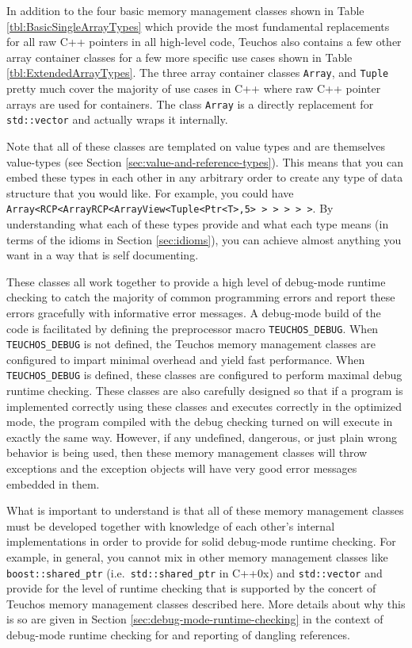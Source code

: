 \documentclass[pdf,ps2pdf,11pt]{SANDreport}
\begin{document}
In addition to the four basic memory management classes shown in Table
{}\ref{tbl:BasicSingleArrayTypes} which provide the most fundamental
replacements for all raw C++ pointers in all high-level code, Teuchos
also contains a few other array container classes for a few more
specific use cases shown in Table {}\ref{tbl:ExtendedArrayTypes}.
The three array container classes {}\texttt{Array}, and
{}\texttt{Tuple} pretty much cover the majority of use cases in C++
where raw C++ pointer arrays are used for containers.  The class
{}\texttt{Array} is a directly replacement for {}\texttt{std::vector}
and actually wraps it internally.

Note that all of these classes are templated on value types and are
themselves value-types (see Section
{}\ref{sec:value-and-reference-types}).  This means that you can
embed these types in each other in any arbitrary order to create any
type of data structure that you would like.  For example, you could
have {}\texttt{Array<RCP<ArrayRCP<ArrayView<Tuple<Ptr<T>,5> > > > >
>}.  By understanding what each of these types provide and what each
type means (in terms of the idioms in Section {}\ref{sec:idioms}), you
can achieve almost anything you want in a way that is self
documenting.

These classes all work together to provide a high level of debug-mode
runtime checking to catch the majority of common programming errors
and report these errors gracefully with informative error messages.  A
debug-mode build of the code is facilitated by defining the
preprocessor macro {}\texttt{TEUCHOS\_DEBUG}.  When
{}\texttt{TEUCHOS\_DEBUG} is not defined, the Teuchos memory
management classes are configured to impart minimal overhead and yield
fast performance.  When {}\texttt{TEUCHOS\_DEBUG} is defined, these
classes are configured to perform maximal debug runtime checking.
These classes are also carefully designed so that if a program is
implemented correctly using these classes and executes correctly in
the optimized mode, the program compiled with the debug checking
turned on will execute in exactly the same way.  However, if any
undefined, dangerous, or just plain wrong behavior is being used, then
these memory management classes will throw exceptions and the
exception objects will have very good error messages embedded in them.

What is important to understand is that all of these memory management
classes must be developed together with knowledge of each other's
internal implementations in order to provide for solid debug-mode
runtime checking.  For example, in general, you cannot mix in other
memory management classes like {}\texttt{boost::shared\_ptr} (i.e.\
{}\texttt{std::shared\_ptr} in C++0x) and {}\texttt{std::vector} and
provide for the level of runtime checking that is supported by the
concert of Teuchos memory management classes described here.  More
details about why this is so are given in Section
{}\ref{sec:debug-mode-runtime-checking} in the context of debug-mode
runtime checking for and reporting of dangling references.
\end{document}
